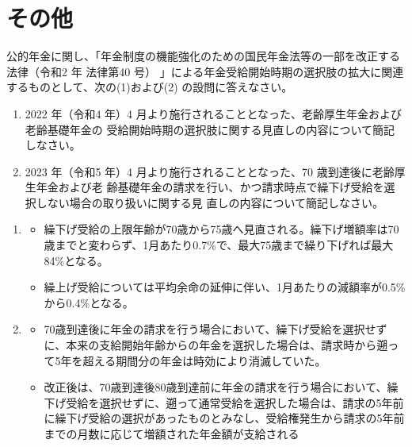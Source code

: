 \section{その他}

\begin{shortanswer}[年金1 2021 問題2(3)]
  公的年金に関し、「年金制度の機能強化のための国民年金法等の一部を改正する法律（令和2 年
法律第40 号） 」による年金受給開始時期の選択肢の拡大に関連するものとして、次の(1)および(2)
の設問に答えなさい。
\begin{enumerate}[(1)]
  \item 2022 年（令和4 年）4 月より施行されることとなった、老齢厚生年金および老齢基礎年金の
受給開始時期の選択肢に関する見直しの内容について簡記しなさい。
  \item 2023 年（令和5 年）4 月より施行されることとなった、70 歳到達後に老齢厚生年金および老
齢基礎年金の請求を行い、かつ請求時点で繰下げ受給を選択しない場合の取り扱いに関する見
直しの内容について簡記しなさい。
\end{enumerate}

\end{shortanswer}

\begin{answerbox}
  \begin{enumerate}[(1)]
  \item 
  \begin{itemize}
    \item 繰下げ受給の上限年齢が70歳から75歳へ見直される。繰下げ増額率は70歳までと変わらず、1月あたり0.7\%で、最大75歳まで繰り下げれば最大84\%となる。
    \item 繰上げ受給については平均余命の延伸に伴い、1月あたりの減額率が0.5\%から0.4\%となる。
  \end{itemize}

  \;

  \item 
  \begin{itemize}
    \item 70歳到達後に年金の請求を行う場合において、繰下げ受給を選択せずに、本来の支給開始年齢からの年金を選択した場合は、請求時から遡って5年を超える期間分の年金は時効により消滅していた。
    \item 改正後は、70歳到達後80歳到達前に年金の請求を行う場合において、繰下げ受給を選択せずに、遡って通常受給を選択した場合は、請求の5年前に繰下げ受給の選択があったものとみなし、受給権発生から請求の5年前までの月数に応じて増額された年金額が支給される
  \end{itemize}
\end{enumerate}
\end{answerbox}

